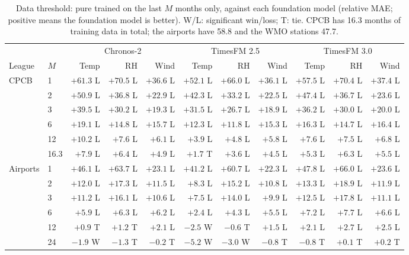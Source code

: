 \begin{table}[t]
\caption{Data threshold: pure \pwm trained on the last $M$ months only, against each foundation model (relative MAE;
positive means the foundation model is better). W/L: significant win/loss; T: tie. CPCB has 16.3 months of training
data in total; the airports have 58.8 and the WMO stations 47.7.}
\label{tab:threshold}
\small
\setlength{\tabcolsep}{3.2pt}
\begin{tabular}{@{}llrrrrrrrrr@{}}
\toprule
 & & \multicolumn{3}{c}{Chronos-2} & \multicolumn{3}{c}{TimesFM 2.5} & \multicolumn{3}{c}{TimesFM 3.0} \\
\cmidrule(lr){3-5}\cmidrule(lr){6-8}\cmidrule(l){9-11}
League & $M$ & Temp & RH & Wind & Temp & RH & Wind & Temp & RH & Wind \\
\midrule
\multirow{6}{*}{CPCB} & 1 & $+61.3$ L & $+70.5$ L & $+36.6$ L & $+52.1$ L & $+66.0$ L & $+36.1$ L & $+57.5$ L & $+70.4$ L & $+37.4$ L \\
 & 2 & $+50.9$ L & $+36.8$ L & $+22.9$ L & $+42.3$ L & $+33.2$ L & $+22.5$ L & $+47.4$ L & $+36.7$ L & $+23.6$ L \\
 & 3 & $+39.5$ L & $+30.2$ L & $+19.3$ L & $+31.5$ L & $+26.7$ L & $+18.9$ L & $+36.2$ L & $+30.0$ L & $+20.0$ L \\
 & 6 & $+19.1$ L & $+14.8$ L & $+15.7$ L & $+12.3$ L & $+11.8$ L & $+15.3$ L & $+16.3$ L & $+14.7$ L & $+16.4$ L \\
 & 12 & $+10.2$ L & $+7.6$ L & $+6.1$ L & $+3.9$ L & $+4.8$ L & $+5.8$ L & $+7.6$ L & $+7.5$ L & $+6.8$ L \\
 & 16.3 & $+7.9$ L & $+6.4$ L & $+4.9$ L & $+1.7$ T & $+3.6$ L & $+4.5$ L & $+5.3$ L & $+6.3$ L & $+5.5$ L \\
\midrule
\multirow{8}{*}{Airports} & 1 & $+46.1$ L & $+63.7$ L & $+23.1$ L & $+41.2$ L & $+60.7$ L & $+22.3$ L & $+47.8$ L & $+66.0$ L & $+23.6$ L \\
 & 2 & $+12.0$ L & $+17.3$ L & $+11.5$ L & $+8.3$ L & $+15.2$ L & $+10.8$ L & $+13.3$ L & $+18.9$ L & $+11.9$ L \\
 & 3 & $+11.2$ L & $+16.1$ L & $+10.6$ L & $+7.5$ L & $+14.0$ L & $+9.9$ L & $+12.5$ L & $+17.8$ L & $+11.1$ L \\
 & 6 & $+5.9$ L & $+6.3$ L & $+6.2$ L & $+2.4$ L & $+4.3$ L & $+5.5$ L & $+7.2$ L & $+7.7$ L & $+6.6$ L \\
 & 12 & $+0.9$ T & $+1.2$ T & $+2.1$ L & $-2.5$ W & $-0.6$ T & $+1.5$ L & $+2.1$ L & $+2.7$ L & $+2.5$ L \\
 & 24 & $-1.9$ W & $-1.3$ T & $-0.2$ T & $-5.2$ W & $-3.0$ W & $-0.8$ T & $-0.8$ T & $+0.1$ T & $+0.2$ T \\

\end{tabular}
\end{table}
